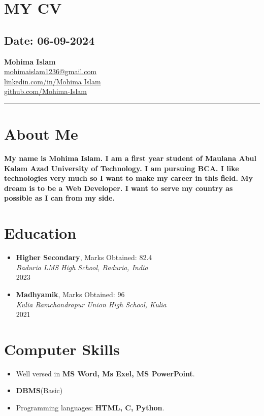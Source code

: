 \documentclass[12pt]{article}
\begin{document}
\section{MY CV}
\subsection*{Date: 06-09-2024}
\begin{center}
    {\LARGE \textbf{Mohima Islam}} \\
    \vspace{2mm}
    \href{mailto:mohimaislam1236@gmail.com}{mohimaislam1236@gmail.com} \\
    \href{https://www.linkedin.com/in/Mohima Islam}{linkedin.com/in/Mohima Islam} \\
    \href{https://github.com/Mohima-Islam}{github.com/Mohima-Islam} \\
    \vspace{2mm}
    \hrule
\end{center}
\section*{About Me}
\textbf{My name is Mohima Islam. I am a first year student of Maulana Abul Kalam Azad University of Technology. I am pursuing BCA. I like technologies very much so I want to make my career in this field. My dream is to be a Web Developer. I want to serve my country as possible as I can from my side. }
\section*{Education}
\begin{itemize}[leftmargin=0.5cm]
    \item \textbf{Higher Secondary}, Marks Obtained: 82.4 \\
    \textit{Baduria LMS High School, Baduria, India} \\
    2023
    \item \textbf{Madhyamik}, Marks Obtained: 96\\
    \textit{Kulia Ramchandrapur Union High School, Kulia}\\
    2021
\end{itemize}
\section*{Computer Skills}
\begin{itemize}[leftmargin=0.5cm]
    \item Well versed in \textbf{MS Word, Ms Exel, MS PowerPoint}.
    \item \textbf{DBMS}(Basic)
    \item Programming languages: \textbf{ HTML, C, Python}.
\end{itemize}
\end{document}
